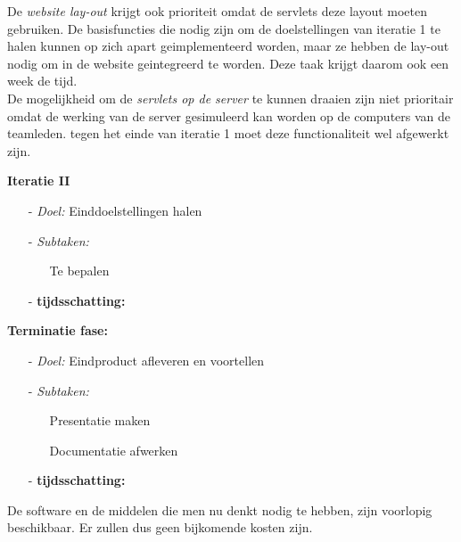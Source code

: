 \documentclass{article}
\begin{document}
\begin{itemize}
De \textit{website lay-out} krijgt ook prioriteit omdat de servlets deze layout moeten gebruiken. De basisfuncties die nodig zijn om de doelstellingen van iteratie 1 te halen kunnen op zich apart geimplementeerd worden, maar ze hebben de lay-out nodig om in de website geintegreerd te worden. Deze taak krijgt daarom ook een week de tijd. \\
De mogelijkheid om de \textit{servlets op de server} te kunnen draaien zijn niet prioritair omdat de werking van de server gesimuleerd kan worden op de computers van de teamleden. tegen het einde van iteratie 1 moet deze functionaliteit wel afgewerkt zijn. \\
\end{itemize}

\textbf{Iteratie II}
\begin{itemize}
\item[-] \textit{Doel:} Einddoelstellingen halen\\[-5mm]
\item[-] \textit{Subtaken:}\\[-5mm]
\begin{itemize}
	\item[] Te bepalen \\[-5mm]
\end{itemize}
\item[-] \textbf{tijdsschatting:} \\[-5mm]
\end{itemize}

\textbf{Terminatie fase:}
\begin{itemize}
\item[-] \textit{Doel:} Eindproduct afleveren en voortellen \\[-5mm]
\item[-] \textit{Subtaken:}\\[-5mm]
\begin{itemize}
	\item[] Presentatie maken \\[-5mm]
	\item[] Documentatie afwerken \\[-5mm]
\end{itemize}
\item[-] \textbf{tijdsschatting:} \\[-5mm]
\end{itemize}

De software en de middelen die men nu denkt nodig te hebben, zijn voorlopig beschikbaar. Er zullen dus geen bijkomende kosten zijn.
\end{document}
